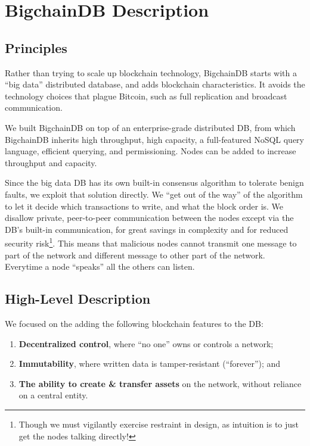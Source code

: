 \section{BigchainDB Description}\label{sec:bigchaindb}

\subsection{Principles}
Rather than trying to scale up blockchain technology, BigchainDB starts with a “big data” distributed database, and adds blockchain characteristics.
It avoids the technology choices that plague Bitcoin, such as full replication and broadcast communication.

We built BigchainDB on top of an enterprise-grade distributed DB, from which BigchainDB inherits high throughput, high capacity, a full-featured NoSQL query language, efficient querying, and permissioning. Nodes can be added to increase throughput and capacity.

Since the big data DB has its own built-in consensus algorithm to tolerate benign faults, we exploit that solution directly.
We “get out of the way” of the algorithm to let it decide which transactions to write, and what the block order is.
We disallow private, peer-to-peer communication between the nodes except via the DB’s built-in communication, for great savings in complexity and for reduced security risk\footnote{Though we must vigilantly exercise restraint in design, as intuition is to just get the nodes talking directly!}.
This means that malicious nodes cannot transmit one message to part of the network and different message to other part of the network. Everytime a node ``speaks'' all the others can listen.

\subsection{High-Level Description}
We focused on the adding the following blockchain features to the DB:
\begin{enumerate}
 \item \textbf{Decentralized control}, where “no one” owns or controls a network;
 \item \textbf{Immutability}, where written data is tamper-resistant (“forever”); and
 \item \textbf{The ability to create \& transfer assets} on the network, without reliance on a central entity.
\end{enumerate}

